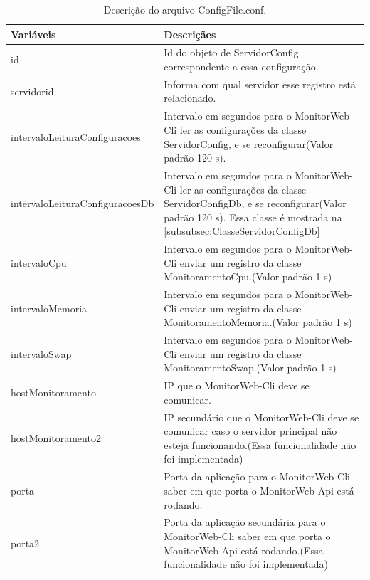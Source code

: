 \begin{table}[H]
\centering
\begin{tabular}{|l|l|}
\hline
{\color[HTML]{000000} \textbf{Variáveis}} & {\color[HTML]{000000} \textbf{Descriçães}} \\ \hline
id                                     & \multicolumn{1}{p{10.00cm}|}{Id do objeto de ServidorConfig correspondente a essa configuração.} \\ \hline
servidorid                             & \multicolumn{1}{p{10.00cm}|}{Informa com qual servidor esse registro está relacionado.}
\\ \hline
intervaloLeituraConfiguracoes          & \multicolumn{1}{p{10.00cm}|}{Intervalo em segundos para o MonitorWeb-Cli ler as configurações da classe ServidorConfig, e se reconfigurar(Valor padrão 120 s).} \\ \hline
intervaloLeituraConfiguracoesDb        & \multicolumn{1}{p{10.00cm}|}{Intervalo em segundos para o  MonitorWeb-Cli ler as configurações da classe ServidorConfigDb, e se reconfigurar(Valor padrão 120 s). Essa classe é mostrada na \autoref{subsubsec:ClasseServidorConfigDb}} \\ \hline
intervaloCpu                           & \multicolumn{1}{p{10.00cm}|}{Intervalo em segundos para o MonitorWeb-Cli enviar um registro da classe MonitoramentoCpu.(Valor padrão 1 s)}\\ \hline
intervaloMemoria                       & \multicolumn{1}{p{10.00cm}|}{Intervalo em segundos para o MonitorWeb-Cli enviar um registro da classe MonitoramentoMemoria.(Valor padrão 1 s)}\\ \hline
intervaloSwap                          & \multicolumn{1}{p{10.00cm}|}{Intervalo em segundos para o MonitorWeb-Cli enviar um registro da classe MonitoramentoSwap.(Valor padrão 1 s)} \\ \hline
hostMonitoramento                      & \multicolumn{1}{p{10.00cm}|}{IP que o MonitorWeb-Cli deve se comunicar.}\\ \hline
hostMonitoramento2                     & \multicolumn{1}{p{10.00cm}|}{IP secundário que o MonitorWeb-Cli deve se comunicar caso o servidor principal não esteja funcionando.(Essa funcionalidade não foi implementada)} \\ \hline
porta                                  & \multicolumn{1}{p{10.00cm}|}{Porta da aplicação para o MonitorWeb-Cli saber em que porta o MonitorWeb-Api está rodando.} \\ \hline
porta2                                 & \multicolumn{1}{p{10.00cm}|}{Porta da aplicação secundária para o MonitorWeb-Cli saber em que porta o MonitorWeb-Api está rodando.(Essa funcionalidade não foi implementada)} \\ \hline
\end{tabular}
\caption[Descrição do arquivo ConfigFile.conf.]{Descrição do arquivo ConfigFile.conf.}
\label{Tab:VariaveisArquivoConfigFile}
\end{table}

